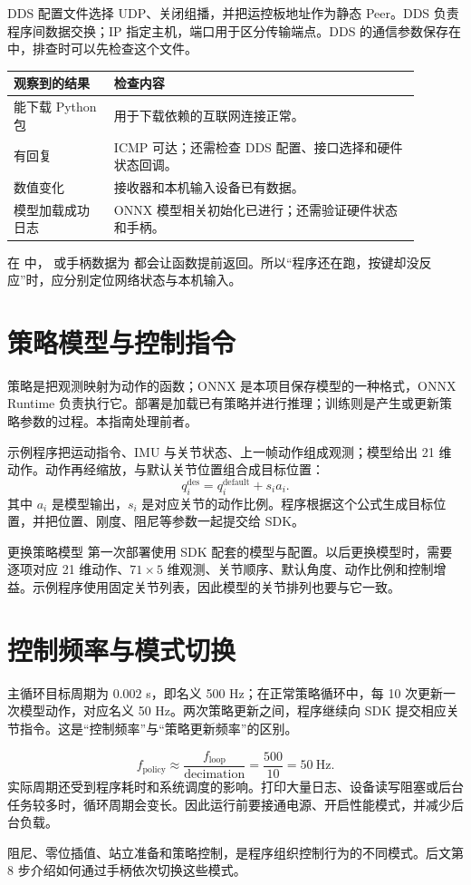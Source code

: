DDS 配置文件选择 UDP、关闭组播，并把运控板地址作为静态 Peer。DDS 负责程序间数据交换；IP 指定主机，端口用于区分传输端点。DDS 的通信参数保存在  中，排查时可以先检查这个文件。

\begin{longtable}{@{}P{0.22\linewidth}P{0.67\linewidth}@{}}
\toprule
\textbf{观察到的结果} & \textbf{检查内容} \\
\midrule
能下载 Python 包 & 用于下载依赖的互联网连接正常。\\
 有回复 & ICMP 可达；还需检查 DDS 配置、接口选择和硬件状态回调。\\
 数值变化 & 接收器和本机输入设备已有数据。\\
模型加载成功日志 & ONNX 模型相关初始化已进行；还需验证硬件状态和手柄。\\
\bottomrule
\end{longtable}

在  中， 或手柄数据为  都会让函数提前返回。所以“程序还在跑，按键却没反应”时，应分别定位网络状态与本机输入。

\section{策略模型与控制指令}
策略是把观测映射为动作的函数；ONNX 是本项目保存模型的一种格式，ONNX Runtime 负责执行它。部署是加载已有策略并进行推理；训练则是产生或更新策略参数的过程。本指南处理前者。

示例程序把运动指令、IMU 与关节状态、上一帧动作组成观测；模型给出 21 维动作。动作再经缩放，与默认关节位置组合成目标位置：
\[
q_i^{\mathrm{des}} = q_i^{\mathrm{default}} + s_i a_i .
\]
其中 $a_i$ 是模型输出，$s_i$ 是对应关节的动作比例。程序根据这个公式生成目标位置，并把位置、刚度、阻尼等参数一起提交给 SDK。

\begin{remark}{更换策略模型}
第一次部署使用 SDK 配套的模型与配置。以后更换模型时，需要逐项对应 21 维动作、$71\times5$ 维观测、关节顺序、默认角度、动作比例和控制增益。示例程序使用固定关节列表，因此模型的关节排列也要与它一致。
\end{remark}

\section{控制频率与模式切换}
主循环目标周期为 $0.002$ s，即名义 500 Hz；在正常策略循环中，每 10 次更新一次模型动作，对应名义 50 Hz。两次策略更新之间，程序继续向 SDK 提交相应关节指令。这是“控制频率”与“策略更新频率”的区别。

\[
f_{\mathrm{policy}} \approx \frac{f_{\mathrm{loop}}}{\mathrm{decimation}}
=\frac{500}{10}=50\ \mathrm{Hz}.
\]
实际周期还受到程序耗时和系统调度的影响。打印大量日志、设备读写阻塞或后台任务较多时，循环周期会变长。因此运行前要接通电源、开启性能模式，并减少后台负载。

阻尼、零位插值、站立准备和策略控制，是程序组织控制行为的不同模式。后文第 8 步介绍如何通过手柄依次切换这些模式。
